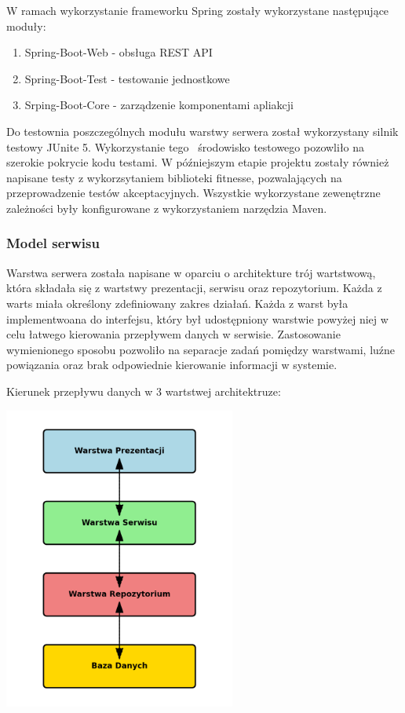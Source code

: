 \documentclass{article}
\begin{document}
W ramach wykorzystanie frameworku Spring zostały wykorzystane  następujące moduły:
\begin{center}
    \begin{enumerate}
        \item Spring-Boot-Web - obsługa REST API \\
        \item Spring-Boot-Test - testowanie jednostkowe \\
        \item Srping-Boot-Core - zarządzenie komponentami apliakcji \\
    \end{enumerate}
\end{center}

Do testownia poszczególnych modułu warstwy serwera został wykorzystany silnik testowy JUnite 5. Wykorzystanie tego  środowisko testowego pozowliło na szerokie pokrycie kodu testami. W późniejszym
etapie projektu zostały również napisane testy z wykorzsytaniem biblioteki fitnesse, pozwalających na przeprowadzenie testów akceptacyjnych.
Wszystkie wykorzystane zewenętrzne zależności były konfigurowane z wykorzystaniem narzędzia Maven.

\subsubsection{Model serwisu}

Warstwa serwera została napisane w oparciu o architekture trój wartstwową, która składała się z wartstwy prezentacji, serwisu oraz repozytorium. Każda z warts miała określony zdefiniowany
zakres działań. Każda z warst była implementwoana do interfejsu, który był udostępniony warstwie powyżej niej w celu łatwego kierowania przepływem danych w serwisie. Zastosowanie wymienionego
sposobu pozwoliło na separacje zadań pomiędzy warstwami, luźne powiązania oraz brak odpowiednie kierowanie informacji w systemie.


Kierunek przepływu danych w 3 wartstwej architektruze:
\begin{center}

    \includegraphics[width=\textwidth, height=10cm]{media/3_layer_architecture.png}

\end{center}
\end{document}
